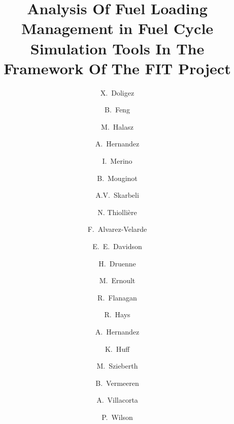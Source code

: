 \documentclass[review]{elsarticle}
\begin{document}
\begin{frontmatter}

\title{Analysis Of Fuel Loading Management in Fuel Cycle Simulation Tools In The Framework Of The FIT Project}



\author[IPNO]{X.~Doligez}
\author[ANL]{B.~Feng}
\author[BUD]{M.~Halasz}
\author[SCK]{A.~Hernandez}
\author[MAULE]{I.~Merino}
\author[MAD]{B.~Mouginot}
\author[CIEMAT]{A.V.~Skarbeli}

\author[SUB]{N. Thiolli\`ere }

\author[CIEMAT]{F.~Alvarez-Velarde}
\author[ORNL]{E.~E.~Davidson}
\author[TRACT]{H.~Druenne}
\author[IPNO]{M.~Ernoult}
\author[USC]{R.~Flanagan}
\author[INL]{R.~Hays}
\author[SCK]{A.~Hernandez}
\author[UI]{K.~Huff}
\author[BUD]{M.~Szieberth}
\author[TRACT]{B.~Vermeeren}
\author[CIEMAT]{A.~Villacorta}
\author[MAD]{P.~Wilson}


\address[IPNO]{Institut de Physique Nucléaire d’Orsay, CNRS-IN2P3/Univ, Paris-Sud, France}
\address[ANL]{Argonne National Laboratory, 9700 Cass Ave., Lemont, IL 60439, USA}
\address[BUD]{Budapest University of Technology and Economics (BME), Institute of Nuclear Techniques, 1111 Budapest, Müegyetem rkp. 3-9, Hungary}
\address[SCK]{Studiecentrum voor kernenergie - Centre d'étude de l'énergie nucléaire (SCK-CEN), Boeretang 200, Mol, Belgium}
\address[MAULE]{Catholic University of the Maule, Av. San Miguel 3605, Talca, Chile}
\address[MAD]{Univ. of Wisconsin Madison, Department of Nuclear Engineering and Engineering Physics, Madison, WI, United States}
\address[SUB]{Subatech, IMTA-IN2P3/CNRS-Universit\'e, Nantes, F-44307, France}
\address[ORNL]{Oak Ridge National Laboratory, Building 5700, Mail Stop 6172, Oak Ridge, TN 37831, United States}
\address[TRACT]{Tractebel Engie, Boulevard Simón Bolívar 34-36, 1000 Brussels, Belgium}
\address[USC]{University of South Carolina, Nuclear Engineering Program, Columbia, SC 29201, United States}
\address[INL]{Idaho National Laboratory, 2525 Fremont Ave., Idaho Falls, ID 83402, USA}
\address[UI]{University of Illinois, Department of Nuclear, Plasma, and Radiological Engineering, United States}
\address[CIEMAT]{CIEMAT, Avda. Complutense, 40, 28040 Madrid, Spain}


\end{frontmatter}
\end{document}
